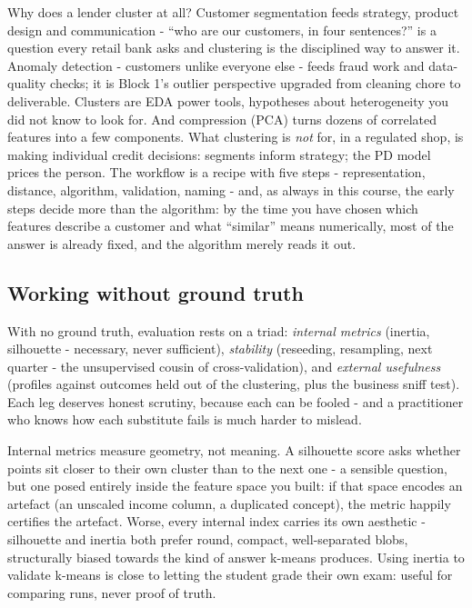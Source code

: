 \documentclass[11pt,a4paper]{article}
\begin{document}
Why does a lender cluster at all? Customer segmentation feeds strategy,
product design and communication - ``who are our customers, in four
sentences?'' is a question every retail bank asks and clustering is the
disciplined way to answer it. Anomaly detection - customers unlike
everyone else - feeds fraud work and data-quality checks; it is Block
1's outlier perspective upgraded from cleaning chore to deliverable.
Clusters are EDA power tools, hypotheses about heterogeneity you did not
know to look for. And compression (PCA) turns dozens of correlated
features into a few components. What clustering is \emph{not} for, in a
regulated shop, is making individual credit decisions: segments inform
strategy; the PD model prices the person. The workflow is a recipe with
five steps - representation, distance, algorithm, validation, naming
- and, as always in this course, the early steps decide more than the
algorithm: by the time you have chosen which features describe a
customer and what ``similar'' means numerically, most of the answer is
already fixed, and the algorithm merely reads it out.

\subsection{Working without ground truth}
With no ground truth, evaluation rests on a triad: \emph{internal
metrics} (inertia, silhouette - necessary, never sufficient),
\emph{stability} (reseeding, resampling, next quarter - the
unsupervised cousin of cross-validation), and \emph{external usefulness}
(profiles against outcomes held out of the clustering, plus the business
sniff test). Each leg deserves honest scrutiny, because each can be
fooled - and a practitioner who knows how each substitute fails is
much harder to mislead.

Internal metrics measure geometry, not meaning. A silhouette score asks
whether points sit closer to their own cluster than to the next one -
a sensible question, but one posed entirely inside the feature space
you built: if that space encodes an artefact (an unscaled income
column, a duplicated concept), the metric happily certifies the
artefact. Worse, every internal index carries its own aesthetic -
silhouette and inertia both prefer round, compact, well-separated
blobs, structurally biased towards the kind of answer k-means produces.
Using inertia to validate k-means is close to letting the student grade
their own exam: useful for comparing runs, never proof of truth.
\end{document}
